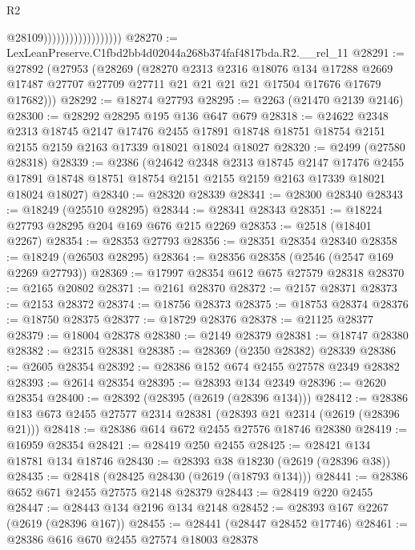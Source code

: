 \begin{lexlean}{R2}
\begin{coremodule}
                                        @28109))))))))))))))))))
@28270 := LexLeanPreserve.C1fbd2bb4d02044a268b374faf4817bda.R2.__rel_11
@28291 := @27892
    (@27953
      (@28269
        (@28270
          @2313
          @2316
          @18076
          @134
          @17288
          @2669
          @17487
          @27707
          @27709
          @27711
          @21
          @21
          @21
          @21
          @17504
          @17676
          @17679
          @17682)))
@28292 := @18274 @27793
@28295 := @2263 (@21470 @2139 @2146)
@28300 := @28292 @28295 @195 @136 @647 @679
@28318 := @24622
    @2348
    @2313
    @18745
    @2147
    @17476
    @2455
    @17891
    @18748
    @18751
    @18754
    @2151
    @2155
    @2159
    @2163
    @17339
    @18021
    @18024
    @18027
@28320 := @2499 (@27580 @28318)
@28339 := @2386
    (@24642
      @2348
      @2313
      @18745
      @2147
      @17476
      @2455
      @17891
      @18748
      @18751
      @18754
      @2151
      @2155
      @2159
      @2163
      @17339
      @18021
      @18024
      @18027)
@28340 := @28320 @28339
@28341 := @28300 @28340
@28343 := @18249 (@25510 @28295)
@28344 := @28341 @28343
@28351 := @18224 @27793 @28295 @204 @169 @676 @215 @2269
@28353 := @2518 (@18401 @2267)
@28354 := @28353 @27793
@28356 := @28351 @28354 @28340
@28358 := @18249 (@26503 @28295)
@28364 := @28356 @28358 (@2546 (@2547 @169 @2269 @27793))
@28369 := @17997 @28354 @612 @675 @27579 @28318
@28370 := @2165 @20802
@28371 := @2161 @28370
@28372 := @2157 @28371
@28373 := @2153 @28372
@28374 := @18756 @28373
@28375 := @18753 @28374
@28376 := @18750 @28375
@28377 := @18729 @28376
@28378 := @21125 @28377
@28379 := @18004 @28378
@28380 := @2149 @28379
@28381 := @18747 @28380
@28382 := @2315 @28381
@28385 := @28369 (@2350 @28382) @28339
@28386 := @2605 @28354
@28392 := @28386 @152 @674 @2455 @27578 @2349 @28382
@28393 := @2614 @28354
@28395 := @28393 @134 @2349
@28396 := @2620 @28354
@28400 := @28392 (@28395 (@2619 (@28396 @134)))
@28412 := @28386 @183 @673 @2455 @27577 @2314 @28381 (@28393 @21 @2314 (@2619 (@28396 @21)))
@28418 := @28386 @614 @672 @2455 @27576 @18746 @28380
@28419 := @16959 @28354
@28421 := @28419 @250 @2455
@28425 := @28421 @134 @18781 @134 @18746
@28430 := @28393 @38 @18230 (@2619 (@28396 @38))
@28435 := @28418 (@28425 @28430 (@2619 (@18793 @134)))
@28441 := @28386 @652 @671 @2455 @27575 @2148 @28379
@28443 := @28419 @220 @2455
@28447 := @28443 @134 @2196 @134 @2148
@28452 := @28393 @167 @2267 (@2619 (@28396 @167))
@28455 := @28441 (@28447 @28452 @17746)
@28461 := @28386 @616 @670 @2455 @27574 @18003 @28378

\end{coremodule}
\end{lexlean}

